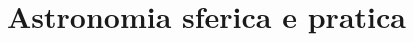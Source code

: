 \documentclass[main.tex]{subfiles}
\begin{document}
\section{Astronomia sferica e pratica}

\end{document}

